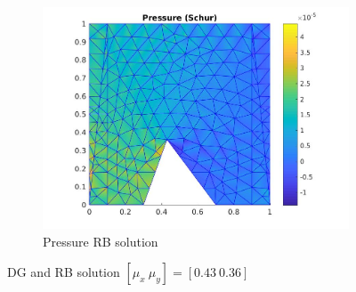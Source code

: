 \documentclass[graybox]{svmult}
\begin{document}
\begin{figure}
\begin{subfigure}{0.31\textwidth}
\includegraphics[width=\linewidth]{offline_pressure_at_43_36.jpg}
\caption{Pressure RB solution} \label{pre_rb}
\end{subfigure}
\caption{DG and RB solution $[\mu_x \ \mu_y] = [0.43 \ 0.36]$} 
\label{dg_rb_solution_43_36}
\end{figure}
\end{document}
